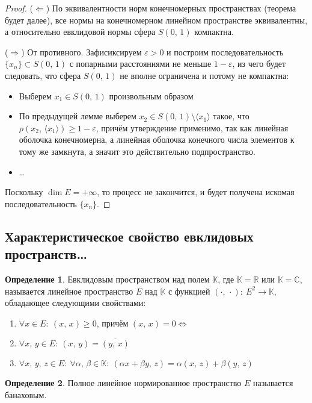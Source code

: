 \documentclass[a4paper,12pt]{article}
\renewcommand{\geq}{\ensuremath{\geqslant}}
\theoremstyle{plain}
\theoremstyle{definition}
\newtheorem{definition}{Определение}[section]
\theoremstyle{remark}
\begin{document}
\begin{proof}
	($\Leftarrow$) По эквивалентности норм конечномерных пространствах (теорема будет далее), все нормы на конечномерном линейном пространстве эквивалентны, а относительно евклидовой нормы сфера $S(0,\,1)$ компактна.

	($\Rightarrow$) От противного. Зафисиксируем $\varepsilon > 0$ и построим последовательность $\{x_n\} \subset S(0,\,1)$ с попарными расстояниями не меньше $1 - \varepsilon$, из чего будет следовать, что сфера $S(0,\,1)$ не вполне ограничена и потому не компактна:
	\begin{itemize}
		\item Выберем $x_1 \in S(0,\,1)$ произвольным образом
		\item По предыдущей лемме выберем $x_2 \in S(0,\,1) \setminus \langle x_1\rangle$ такое, что $\rho(x_2,\, \langle x_1\rangle) \geq 1 - \varepsilon$, причём утверждение применимо, так как линейная оболочка конечномерна, а линейная оболочка конечного числа элементов к тому же замкнута, а значит это действительно подпространство.
		\item \dots
	\end{itemize}
	Поскольку $\dim E = +\infty$, то процесс не закончится, и будет получена искомая последовательность $\{x_n\}$.
\end{proof}

\subsection{Характеристическое свойство евклидовых пространств\dots}
\begin{definition}
	Евклидовым пространством над полем $\mathbb{K}$, где $\mathbb{K} = \mathbb{R}$ или $\mathbb{K} = \mathbb{C}$, называется линейное пространство $E$ над $\mathbb{K}$ с функцией $(\cdot,\, \cdot) :\: E^2 \to \mathbb{K}$, обладающее следующими свойствами:
	\begin{enumerate}
		\item $\forall x \in E :\: (x,\, x) \geq 0$, причём $(x,\, x) = 0 \Leftrightarrow$
		\item $\forall x,\,y \in E :\: (x,\,y) = \overline{(y,\, x)}$
		\item $\forall x,\,y,\, z \in E :\: \forall \alpha,\, \beta \in \mathbb{K} :\: (\alpha x + \beta y,\, z) = \alpha(x,\,z) + \beta(y,\,z)$
	\end{enumerate}
\end{definition}

\begin{definition}
	Полное линейное нормированное пространство $E$ называется банаховым.
\end{definition}
\end{document}
